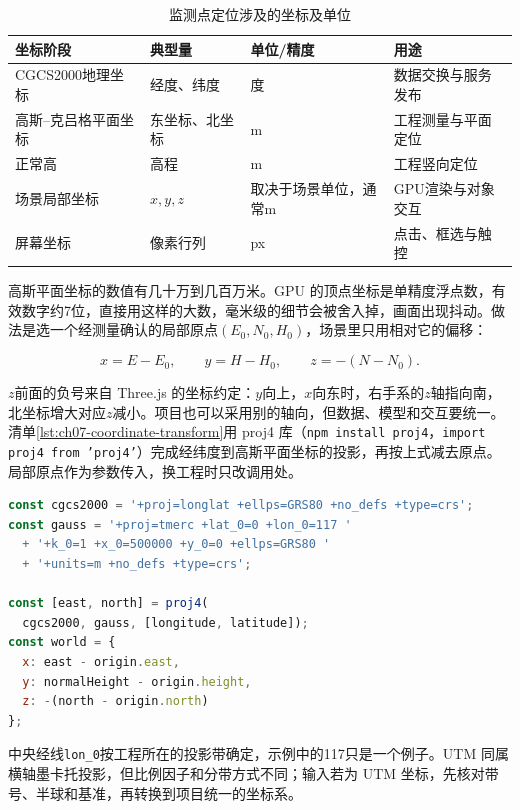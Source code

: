 \begin{table}[htbp]
\centering
\caption{监测点定位涉及的坐标及单位}
\label{tab:ch7-coordinate-units}
\begin{tabular}{p{3.0cm}p{3.1cm}p{3.2cm}p{3.2cm}}
\toprule
坐标阶段 & 典型量 & 单位/精度 & 用途 \\
\midrule
CGCS2000地理坐标 & 经度、纬度 & 度 & 数据交换与服务发布 \\
高斯--克吕格平面坐标 & 东坐标、北坐标 & m & 工程测量与平面定位 \\
正常高 & 高程 & m & 工程竖向定位 \\
场景局部坐标 & $x,y,z$ & 取决于场景单位，通常m & GPU渲染与对象交互 \\
屏幕坐标 & 像素行列 & px & 点击、框选与触控 \\
\bottomrule
\end{tabular}
\end{table}

高斯平面坐标的数值有几十万到几百万米。GPU 的顶点坐标是单精度浮点数，有效数字约7位，直接用这样的大数，毫米级的细节会被舍入掉，画面出现抖动。做法是选一个经测量确认的局部原点$(E_0,N_0,H_0)$，场景里只用相对它的偏移：

\[
x=E-E_0,\qquad y=H-H_0,\qquad z=-(N-N_0).
\]

$z$前面的负号来自 Three.js 的坐标约定：$y$向上，$x$向东时，右手系的$z$轴指向南，北坐标增大对应$z$减小。项目也可以采用别的轴向，但数据、模型和交互要统一。清单\ref{lst:ch07-coordinate-transform}用 proj4 库（\texttt{npm install proj4}，\texttt{import proj4 from 'proj4'}）完成经纬度到高斯平面坐标的投影，再按上式减去原点。局部原点作为参数传入，换工程时只改调用处。

\begin{lstlisting}[label={lst:ch07-coordinate-transform},language=JavaScript,breaklines=true,caption={坐标与单位转换}]
const cgcs2000 = '+proj=longlat +ellps=GRS80 +no_defs +type=crs';
const gauss = '+proj=tmerc +lat_0=0 +lon_0=117 '
  + '+k_0=1 +x_0=500000 +y_0=0 +ellps=GRS80 '
  + '+units=m +no_defs +type=crs';

const [east, north] = proj4(
  cgcs2000, gauss, [longitude, latitude]);
const world = {
  x: east - origin.east,
  y: normalHeight - origin.height,
  z: -(north - origin.north)
};
\end{lstlisting}

中央经线\texttt{lon\_0}按工程所在的投影带确定，示例中的117只是一个例子。UTM 同属横轴墨卡托投影，但比例因子和分带方式不同；输入若为 UTM 坐标，先核对带号、半球和基准，再转换到项目统一的坐标系。

